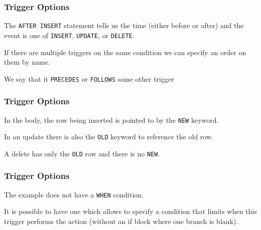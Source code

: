 \begin{frame}
\frametitle{Trigger Options}

The \texttt{AFTER INSERT} statement tells us the time (either before or after) and the event is one of \texttt{INSERT}, \texttt{UPDATE}, or \texttt{DELETE}.


If there are multiple triggers on the same condition we can specify an order on them by name. 

We say that it \texttt{PRECEDES} or \texttt{FOLLOWS} some other trigger

\end{frame}

\begin{frame}
\frametitle{Trigger Options}

In the body, the row being inserted is pointed to by the \texttt{NEW} keyword. 

In an update there is also the \texttt{OLD} keyword to reference the old row. 

A delete has only the \texttt{OLD} row and there is no \texttt{NEW}.


\end{frame}

\begin{frame}
\frametitle{Trigger Options}

The example does not have a \texttt{WHEN} condition. 

It is possible to have one which allows to specify a condition that limits when this trigger performs the action (without an if block where one branch is blank). 



\end{frame}







